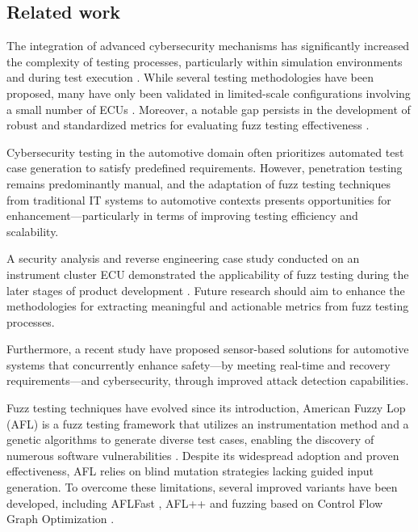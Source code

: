 \documentclass[a4paper, fleqn]{template/cas-dc}
\begin{document}
	\subsection{Related work}
	
	The integration of advanced cybersecurity mechanisms has significantly increased the complexity of testing processes, particularly within simulation environments and during test execution  \cite{marksteiner2021using}. While several testing methodologies have been proposed, many have only been validated in limited-scale configurations involving a small number of ECUs \cite{oruganti2019hardware}. Moreover, a notable gap persists in the development of robust and standardized metrics for evaluating fuzz testing effectiveness \cite{fowler2019method}.
	
	Cybersecurity testing in the automotive domain often prioritizes automated test case generation to satisfy predefined requirements. However, penetration testing remains predominantly manual, and the adaptation of fuzz testing techniques from traditional IT systems to automotive contexts presents opportunities for enhancement—particularly in terms of improving testing efficiency and scalability.
	
	A security analysis and reverse engineering case study conducted on an instrument cluster ECU demonstrated the applicability of fuzz testing during the later stages of product development \cite{anistoroaei2022security}. Future research should aim to enhance the methodologies for extracting meaningful and actionable metrics from fuzz testing processes.
	
	Furthermore, a recent study \cite{wang2020real} have proposed sensor-based solutions for automotive systems that concurrently enhance safety—by meeting real-time and recovery requirements—and cybersecurity, through improved attack detection capabilities. 
	
	Fuzz testing techniques have evolved since its introduction, American Fuzzy Lop (AFL) is a fuzz testing framework that utilizes an instrumentation method and a genetic algorithms to generate diverse test cases, enabling the discovery of numerous software vulnerabilities \cite{zalewski2017american}. Despite its widespread adoption and proven effectiveness, AFL relies on blind mutation strategies lacking guided input generation. To overcome these limitations, several improved variants have been developed, including AFLFast \cite{bohme2016coverage}, AFL++ \cite{fioraldi2020afl++} and fuzzing based on Control Flow Graph Optimization \cite{10662925}.
	
\end{document}
